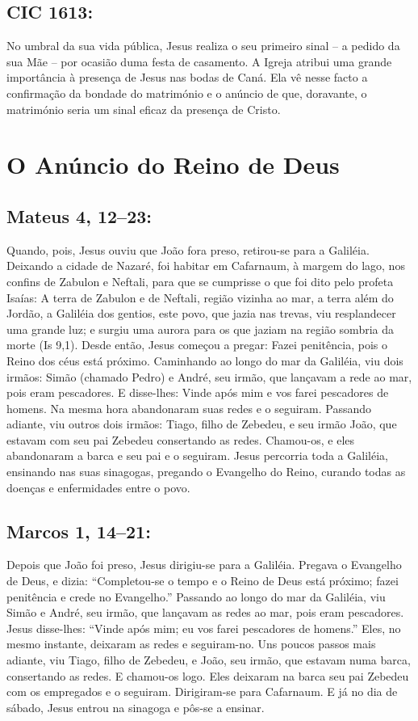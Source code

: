 \documentclass[10pt,a5paper]{book}
\newcommand{\from}[1]{\subsection*{#1}}
\begin{document}
\from{CIC 1613:}

No umbral da sua vida pública, Jesus realiza o seu primeiro sinal -- a pedido da sua Mãe -- por ocasião duma festa de casamento.
A Igreja atribui uma grande importância à presença de Jesus nas bodas de Caná.
Ela vê nesse facto a confirmação da bondade do matrimónio e o anúncio de que, doravante, o matrimónio seria um sinal eficaz da presença de Cristo.


\section{O Anúncio do Reino de Deus}

\from{Mateus 4, 12--23:}

Quando, pois, Jesus ouviu que João fora preso, retirou-se para a Galiléia.
Deixando a cidade de Nazaré, foi habitar em Cafarnaum, à margem do lago, nos confins de Zabulon e Neftali,
para que se cumprisse o que foi dito pelo profeta Isaías:
A terra de Zabulon e de Neftali, região vizinha ao mar, a terra além do Jordão, a Galiléia dos gentios,
este povo, que jazia nas trevas, viu resplandecer uma grande luz;
e surgiu uma aurora para os que jaziam na região sombria da morte (Is 9,1).
Desde então, Jesus começou a pregar:
Fazei penitência, pois o Reino dos céus está próximo.
Caminhando ao longo do mar da Galiléia, viu dois irmãos:
Simão (chamado Pedro) e André, seu irmão, que lançavam a rede ao mar, pois eram pescadores.
E disse-lhes:
Vinde após mim e vos farei pescadores de homens.
Na mesma hora abandonaram suas redes e o seguiram.
Passando adiante, viu outros dois irmãos:
Tiago, filho de Zebedeu, e seu irmão João, que estavam com seu pai Zebedeu consertando as redes.
Chamou-os, e eles abandonaram a barca e seu pai e o seguiram.
Jesus percorria toda a Galiléia, ensinando nas suas sinagogas, pregando o Evangelho do Reino, curando todas as doenças e enfermidades entre o povo.

\from{Marcos 1, 14--21:}

Depois que João foi preso, Jesus dirigiu-se para a Galiléia.
Pregava o Evangelho de Deus, e dizia:
``Completou-se o tempo e o Reino de Deus está próximo;
fazei penitência e crede no Evangelho.''
Passando ao longo do mar da Galiléia, viu Simão e André, seu irmão, que lançavam as redes ao mar, pois eram pescadores.
Jesus disse-lhes:
``Vinde após mim;
eu vos farei pescadores de homens.''
Eles, no mesmo instante, deixaram as redes e seguiram-no.
Uns poucos passos mais adiante, viu Tiago, filho de Zebedeu, e João, seu irmão, que estavam numa barca, consertando as redes.
E chamou-os logo.
Eles deixaram na barca seu pai Zebedeu com os empregados e o seguiram.
Dirigiram-se para Cafarnaum.
E já no dia de sábado, Jesus entrou na sinagoga e pôs-se a ensinar.
\end{document}
